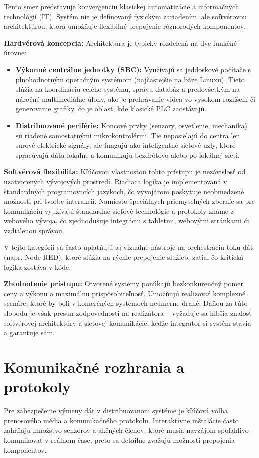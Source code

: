 Tento smer predstavuje konvergenciu klasickej automatizácie a informačných technológií (IT). Systém nie je definovaný fyzickým zariadením, ale softvérovou architektúrou, ktorá umožňuje flexibilné prepojenie rôznorodých komponentov.

\textbf{Hardvérová koncepcia:}
Architektúra je typicky rozdelená na dve funkčné úrovne:
\begin{itemize}
    \item \textbf{Výkonné centrálne jednotky (SBC):} Využívajú sa jeddoskové počítače s plnohodnotným operačným systémom (najčastejšie na báze Linuxu). Tieto slúžia na koordináciu celého systému, správu databáz a predovšetkým na náročné multimediálne úlohy, ako je prehrávanie videa vo vysokom rozlíšení či generovanie grafiky, čo je oblasť, kde klasické PLC zaostávajú.
    \item \textbf{Distribuované periférie:} Koncové prvky (senzory, osvetlenie, mechanika) sú riadené samostatnými mikrokontrolérmi. Tie neposielajú do centra len surové elektrické signály, ale fungujú ako inteligentné sieťové uzly, ktoré spracúvajú dáta lokálne a komunikujú bezdrôtovo alebo po lokálnej sieti.
\end{itemize}

\textbf{Softvérová flexibilita:}
Kľúčovou vlastnosťou tohto prístupu je nezávislosť od uzatvorených vývojových prostredí. Riadiaca logika je implementovaná v štandardných programovacích jazykoch, čo vývojárom poskytuje neobmedzené možnosti pri tvorbe interakcií. Namiesto špeciálnych priemyselných zberníc sa pre komunikáciu využívajú štandardné sieťové technológie a protokoly známe z webového vývoja, čo zjednodušuje integráciu s tabletmi, webovými stránkami či vzdialenou správou.

V tejto kategórii sa často uplatňujú aj vizuálne nástroje na orchestráciu toku dát (napr. Node-RED), ktoré slúžia na rýchle prepojenie služieb, zatiaľ čo kritická logika zostáva v kóde.

\textbf{Zhodnotenie prístupu:}
Otvorené systémy ponúkajú bezkonkurenčný pomer ceny a výkonu a maximálnu prispôsobiteľnosť. Umožňujú realizovať komplexné scenáre, ktoré by boli v komerčných systémoch neúmerne drahé. Daňou za túto slobodu je však presun zodpovednosti na realizátora – vyžaduje sa hlbšia znalosť softvérovej architektúry a sieťovej komunikácie, keďže integrátor si systém stavia a garantuje sám.

\section{Komunikačné rozhrania a protokoly}
\label{komunikacne-protokoly}
Pre zabezpečenie výmeny dát v distribuovanom systéme je kľúčová voľba prenosového média a komunikačného protokolu. Interaktívne inštalácie často zahŕňajú množstvo senzorov a akčných členov, ktoré musia navzájom spoľahlivo komunikovať v reálnom čase, preto sa detailne zvažujú možnosti prepojenia komponentov.


